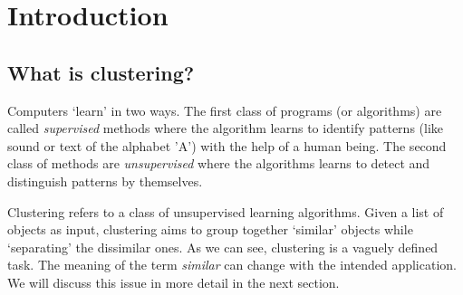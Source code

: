 \documentclass[letterpaper,12pt,titlepage,oneside,final]{book}
\begin{document}
 

\chapter{Introduction}
\section{What is clustering?}
Computers `learn' in two ways. The first class of programs (or algorithms) are called \textit{supervised} methods where the algorithm learns to identify patterns (like sound or text of the alphabet 'A') with the help of a human being.  The second class of methods are \textit{unsupervised} where the algorithms learns to detect and distinguish patterns by themselves. 

Clustering refers to a class of unsupervised learning algorithms. Given a list of objects as input, clustering aims to group together `similar' objects while `separating' the dissimilar ones. As we can see, clustering is a vaguely defined task. The meaning of the term \textit{similar} can change with the intended application. We will discuss this issue in more detail in the next section. 
\end{document}
